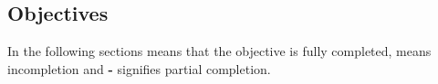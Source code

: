 \subsection{Objectives}
\label{sub:objectives}

In the following sections \Checkmark means that the objective is fully completed, \XSolidBrush means incompletion and \textbf{-} signifies partial  completion.


